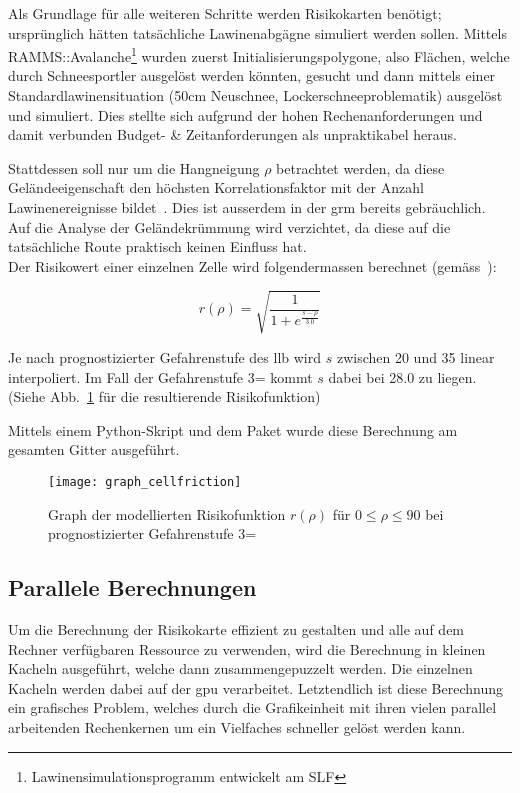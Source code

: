 Als Grundlage für alle weiteren Schritte werden Risikokarten benötigt; ursprünglich hätten tatsächliche Lawinenabgägne simuliert werden sollen. Mittels RAMMS::Avalanche\footnote{Lawinensimulationsprogramm entwickelt am SLF} wurden zuerst Initialisierungspolygone, also Flächen, welche durch Schneesportler ausgelöst werden könnten, gesucht und dann mittels einer Standardlawinensituation (50cm Neuschnee, Lockerschneeproblematik) ausgelöst und simuliert. Dies stellte sich aufgrund der hohen Rechenanforderungen und damit verbunden Budget- \& Zeitanforderungen als unpraktikabel heraus.

Stattdessen soll nur um die Hangneigung $\rho$ betrachtet werden, da diese Geländeeigenschaft den höchsten Korrelationsfaktor mit der Anzahl Lawinenereignisse bildet~\cite{arpddatasetdocs}. Dies ist ausserdem in der \gls{grm} bereits gebräuchlich. Auf die Analyse der Geländekrümmung wird verzichtet, da diese auf die tatsächliche Route praktisch keinen Einfluss hat.\\
Der Risikowert einer einzelnen Zelle wird folgendermassen berechnet (gemäss~\citeauthor{sacbergspwinterp99})\cite{sacbergspwinterp99}:

\[
r(\rho) = \sqrt{\frac{1}{1 + e^{\frac{s-\rho}{3.0}}}}
\]

Je nach prognostizierter Gefahrenstufe des \gls{llb} wird $s$ zwischen 20 und 35 linear interpoliert. Im Fall der Gefahrenstufe 3= kommt $s$ dabei bei 28.0 zu liegen. (Siehe Abb.~\ref{fig:graph} für die resultierende Risikofunktion)

Mittels einem Python-Skript und dem Paket  wurde diese Berechnung am gesamten Gitter ausgeführt.

\begin{figure}[H]
  \centering
  \texttt{[image: graph\_cellfriction]}
  \caption{Graph der modellierten Risikofunktion $r(\rho)$ für $0 \leq \rho \leq 90$ bei prognostizierter Gefahrenstufe 3=}\label{fig:graph}
\end{figure}

\subsection{Parallele Berechnungen}

Um die Berechnung der Risikokarte effizient zu gestalten und alle auf dem Rechner verfügbaren Ressource zu verwenden, wird die Berechnung in kleinen Kacheln ausgeführt, welche dann zusammengepuzzelt werden. Die einzelnen Kacheln werden dabei auf der \acrshort{gpu} verarbeitet. Letztendlich ist diese Berechnung ein grafisches Problem, welches durch die Grafikeinheit mit ihren vielen parallel arbeitenden Rechenkernen um ein Vielfaches schneller gelöst werden kann.

